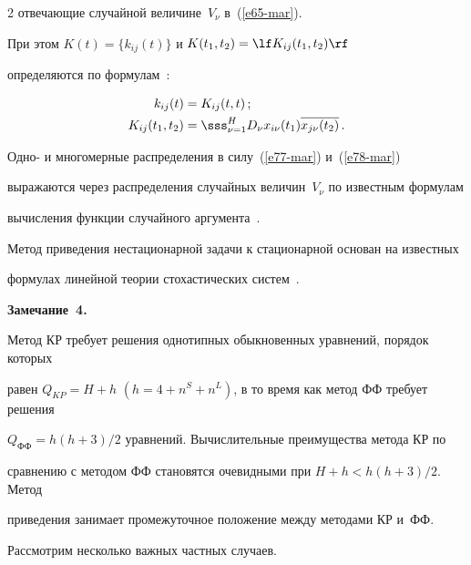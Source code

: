 \begin{multicols}{2}
отвечающие случайной величине~$V_\nu$ в~(\ref{e65-mar}). 


При этом  $K(t)=\{k_{ij}(t)\}$ и $K(t_1, t_2) =\lf K_{ij} (t_1, t_2)\rf$ 


определяются по формулам~\cite{11-mar, 17-mar}:


\begin{align*}


k_{ij}(t) &= K_{ij}(t,t)\,;\\


K_{ij}(t_1, t_2) &= \sss_{\nu=1}^H D_\nu x_{i\nu} (t_1) \overline{x_{j\nu}(t_2)}\,.


\end{align*}


Одно- и многомерные распределения в силу~(\ref{e77-mar}) и~(\ref{e78-mar}) 


выражаются через распределения случайных величин~$V_\nu$ по известным формулам 


вычисления функции случайного аргумента~\cite{11-mar, 17-mar}.





Метод приведения нестационарной задачи к стационарной основан на известных 


формулах линейной теории стохастических сис\-тем~\cite{11-mar, 17-mar}.





\medskip





\noindent


\textbf{Замечание~4.}


 Метод КР требует решения однотипных обыкновенных уравнений, порядок которых 


 равен  $Q_{KP} = H+h$ $(h=4+n^S+n^L)$, в то время как метод ФФ требует решения  


 $Q_{\mathrm{ФФ}} = h(h+3)/2$ уравнений. Вычислительные преимущества метода КР по 


 сравнению  с методом ФФ становятся очевидными при  $H+h < h(h +3)/2$. Метод 


 приведения занимает промежуточное положение между методами КР и~ФФ.





Рассмотрим несколько важных частных случаев.





\smallskip






\end{multicols}
